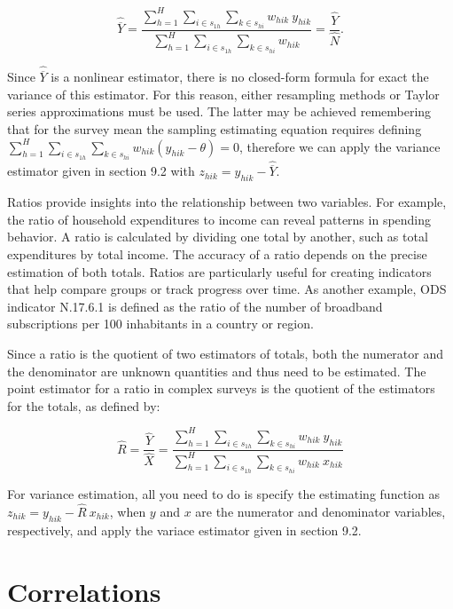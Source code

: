 \documentclass[
  12pt,
]{book}
\begin{document}
\[
\widehat{\overline{Y}} = \frac{\sum_{h=1}^{H}\sum_{i \in s_{1h}} \sum_{ k \in s_{hi}} w_{hik} \ y_{hik}} {\sum_{h=1}^{H}\sum_{i \in s_{1h}} \sum_{ k \in s_{hi}} w_{hik}} = \frac{\widehat{Y}}{\widehat{N}}.
\]

Since \(\widehat{\overline{Y}}\) is a nonlinear estimator, there is no closed-form formula for exact the variance of this estimator. For this reason, either resampling methods or Taylor series approximations must be used. The latter may be achieved remembering that for the survey mean the sampling estimating equation requires defining \(\sum_{h=1}^{H}\sum_{i \in s_{1h}} \sum_{ k \in s_{hi}} w_{hik} (y_{hik} - \theta) = 0\), therefore we can apply the variance estimator given in section 9.2 with \(z_{hik} = y_{hik} - \widehat{\overline{Y}}\).

Ratios provide insights into the relationship between two variables. For example, the ratio of household expenditures to income can reveal patterns in spending behavior. A ratio is calculated by dividing one total by another, such as total expenditures by total income. The accuracy of a ratio depends on the precise estimation of both totals. Ratios are particularly useful for creating indicators that help compare groups or track progress over time. As another example, ODS indicator N.17.6.1 is defined as the ratio of the number of broadband subscriptions per 100 inhabitants in a country or region.

Since a ratio is the quotient of two estimators of totals, both the numerator and the denominator are unknown quantities and thus need to be estimated. The point estimator for a ratio in complex surveys is the quotient of the estimators for the totals, as defined by:

\[
\widehat{R} = \frac{\widehat{Y}}{\widehat{X}}
= \frac{\sum_{h=1}^{H}\sum_{i \in s_{1h}} \sum_{ k \in s_{hi}}  w_{hik} \ y_{hik}}{\sum_{h=1}^{H}\sum_{i \in s_{1h}} \sum_{ k \in s_{hi}}  w_{hik} \ x_{hik}}
\]

For variance estimation, all you need to do is specify the estimating function as \(z_{hik} = y_{hik} - \widehat{R} \ x_{hik}\), when \(y\) and \(x\) are the numerator and denominator variables, respectively, and apply the variace estimator given in section 9.2.

\hypertarget{correlations}{%
\section{Correlations}\label{correlations}}
\end{document}
